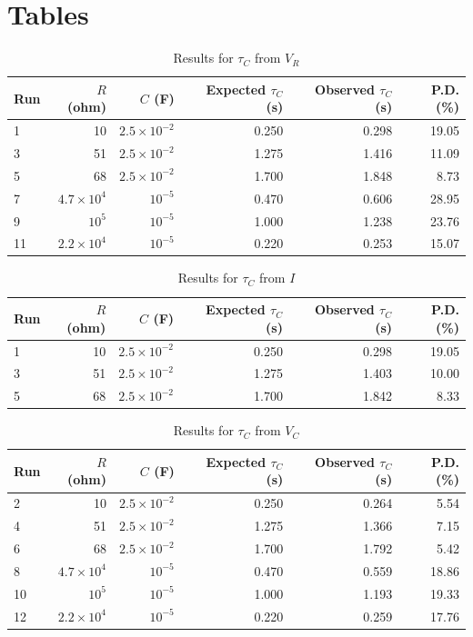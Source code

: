 \section{Tables}
%
\begin{table}[ht]
    \centering
    \begin{tabular}{|l|r|r|r|r|r|}
        \hline
        Run & $R$ (ohm) & $C$ (F) & Expected $\tau_{C}$ (s) & Observed $\tau_{C}$ (s) & P.D. (\%) \\
        \hline
        1 & 10 & $2.5 \times 10^{-2}$ & 0.250 & 0.298 & 19.05 \\
        3 & 51 & $2.5 \times 10^{-2}$ & 1.275 & 1.416 & 11.09 \\
        5 & 68 & $2.5 \times 10^{-2}$ & 1.700 & 1.848 & 8.73 \\
        7 & $4.7 \times 10^{4}$ & $10^{-5}$ & 0.470 & 0.606 & 28.95 \\
        9 & $10^{5}$ & $10^{-5}$ & 1.000 & 1.238 & 23.76 \\
        11 & $2.2 \times 10^{4}$ & $10^{-5}$ & 0.220 & 0.253 & 15.07 \\
        \hline
    \end{tabular}
    \caption{Results for $\tau_{C}$ from $V_{R}$}
    \label{table.05.results.tauC.VR}
\end{table}
%
\begin{table}[ht]
    \centering
    \begin{tabular}{|l|r|r|r|r|r|}
        \hline
        Run & $R$ (ohm) & $C$ (F) & Expected $\tau_{C}$ (s) & Observed $\tau_{C}$ (s) & P.D. (\%) \\
        \hline
        1 & 10 & $2.5 \times 10^{-2}$ & 0.250 & 0.298 & 19.05 \\
        3 & 51 & $2.5 \times 10^{-2}$ & 1.275 & 1.403 & 10.00 \\
        5 & 68 & $2.5 \times 10^{-2}$ & 1.700 & 1.842 & 8.33 \\
        \hline
    \end{tabular}
    \caption{Results for $\tau_{C}$ from $I$}
    \label{table.05.results.tauC.I}
\end{table}
%
\begin{table}[ht]
    \centering
    \begin{tabular}{|l|r|r|r|r|r|}
        \hline
        Run & $R$ (ohm) & $C$ (F) & Expected $\tau_{C}$ (s) & Observed $\tau_{C}$ (s) & P.D. (\%) \\
        \hline
        2 & 10 & $2.5 \times 10^{-2}$ & 0.250 & 0.264 & 5.54 \\
        4 & 51 & $2.5 \times 10^{-2}$ & 1.275 & 1.366 & 7.15 \\
        6 & 68 & $2.5 \times 10^{-2}$ & 1.700 & 1.792 & 5.42 \\
        8 & $4.7 \times 10^{4}$ & $10^{-5}$ & 0.470 & 0.559 & 18.86 \\
        10 & $10^{5}$ & $10^{-5}$ & 1.000 & 1.193 & 19.33 \\
        12 & $2.2 \times 10^{4}$ & $10^{-5}$ & 0.220 & 0.259 & 17.76 \\
        \hline
    \end{tabular}
    \caption{Results for $\tau_{C}$ from $V_{C}$}
    \label{table.05.results.tauC.VC}
\end{table}
